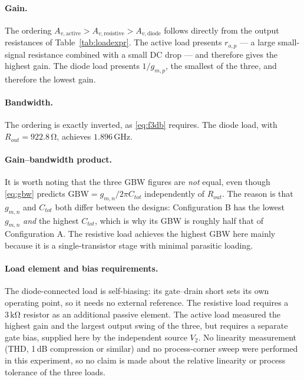 \documentclass[12pt,a4paper]{article}
\newcommand{\U}[1]{\,\mathrm{#1}}
\begin{document}
\paragraph{Gain.}
The ordering $A_{v,\text{active}} > A_{v,\text{resistive}} > A_{v,\text{diode}}$
follows directly from the output resistances of
Table~\ref{tab:loadexpr}. The active load presents $r_{o,p}$ --- a large
small-signal resistance combined with a small DC drop --- and therefore gives
the highest gain. The diode load presents $1/g_{m,p}$, the smallest of the
three, and therefore the lowest gain.

\paragraph{Bandwidth.}
The ordering is exactly inverted, as \eqref{eq:f3db} requires. The diode load,
with $R_{out}=922.8\U{\Omega}$, achieves $1.896\U{GHz}$.

\paragraph{Gain--bandwidth product.}
It is worth noting that the three GBW figures are \emph{not} equal, even though
\eqref{eq:gbw} predicts $\mathrm{GBW}=g_{m,n}/2\pi C_{tot}$ independently of
$R_{out}$. The reason is that $g_{m,n}$ and $C_{tot}$ both differ between the
designs: Configuration B has the lowest $g_{m,n}$ \emph{and} the highest
$C_{tot}$, which is why its GBW is roughly half that of Configuration A. The
resistive load achieves the highest GBW here mainly because it is a
single-transistor stage with minimal parasitic loading.

\paragraph{Load element and bias requirements.}
The diode-connected load is self-biasing: its gate--drain short sets its own
operating point, so it needs no external reference. The resistive load requires
a $3\U{k\Omega}$ resistor as an additional passive element. The active load
measured the highest gain and the largest output swing of the three, but
requires a separate gate bias, supplied here by the independent source $V_2$.
No linearity measurement (THD, 1\,dB compression or similar) and no process-corner
sweep were performed in this experiment, so no claim is made about the relative
linearity or process tolerance of the three loads.

\end{document}
